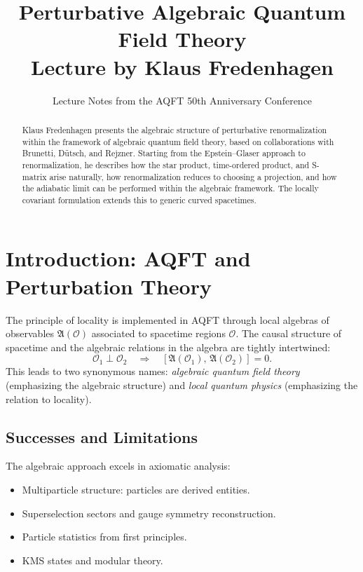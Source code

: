 \documentclass[11pt,a4paper]{article}
\title{\textbf{Perturbative Algebraic Quantum Field Theory}\\[6pt]
\large Lecture by Klaus Fredenhagen}
\author{Lecture Notes from the AQFT 50th Anniversary Conference}
\date{}
\begin{document}
\maketitle

\begin{abstract}
Klaus Fredenhagen presents the algebraic structure of perturbative renormalization
within the framework of algebraic quantum field theory, based on collaborations with
Brunetti, D\"utsch, and Rejzner. Starting from the Epstein--Glaser approach to
renormalization, he describes how the star product, time-ordered product, and
S-matrix arise naturally, how renormalization reduces to choosing a projection,
and how the adiabatic limit can be performed within the algebraic framework.
The locally covariant formulation extends this to generic curved spacetimes.
\end{abstract}

\tableofcontents

\section{Introduction: AQFT and Perturbation Theory}

The principle of locality is implemented in AQFT through local algebras
of observables $\mathfrak{A}(\mathcal{O})$ associated to spacetime regions
$\mathcal{O}$. The causal structure of spacetime and the algebraic
relations in the algebra are tightly intertwined:
\[
  \mathcal{O}_1 \perp \mathcal{O}_2 \quad\Longrightarrow\quad
  [\mathfrak{A}(\mathcal{O}_1),\,\mathfrak{A}(\mathcal{O}_2)] = 0.
\]
This leads to two synonymous names: \emph{algebraic quantum field theory}
(emphasizing the algebraic structure) and \emph{local quantum physics}
(emphasizing the relation to locality).

\subsection{Successes and Limitations}

The algebraic approach excels in axiomatic analysis:
\begin{itemize}[nosep]
  \item Multiparticle structure: particles are derived entities.
  \item Superselection sectors and gauge symmetry reconstruction.
  \item Particle statistics from first principles.
  \item KMS states and modular theory.
\end{itemize}
\end{document}
